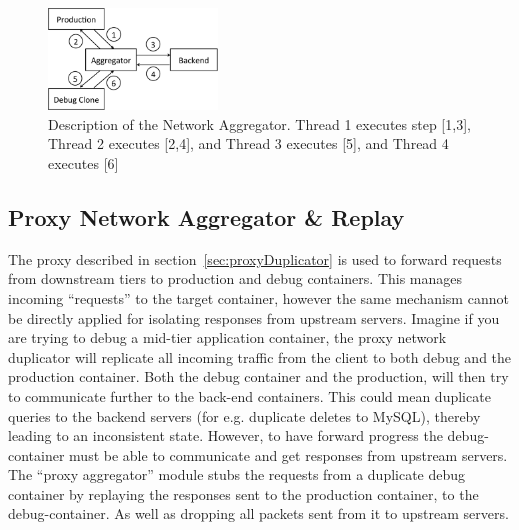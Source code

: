\begin{figure}[ht]
  \begin{center}
    \includegraphics[width=0.4\textwidth]{figs/aggregator.pdf}
    \caption{Description of the Network Aggregator. Thread 1 executes step [1,3], Thread 2 executes [2,4], and Thread 3 executes [5], and Thread 4 executes [6]}
    \label{fig:aggregator}
  \end{center}
\end{figure}

\subsection{Proxy Network Aggregator \& Replay }
\label{sec:proxyAggregator}
The proxy described in section~\ref{sec:proxyDuplicator} is used to forward requests from downstream tiers to production and debug containers.
This manages incoming ``requests'' to the target container, however the same mechanism cannot be directly applied for isolating responses from upstream servers.
Imagine if you are trying to debug a mid-tier application container, the proxy network duplicator will replicate all incoming traffic from the client to both debug and the production container. 
Both the debug container and the production, will then try to communicate further to the back-end containers.
This could mean duplicate queries to the backend servers (for e.g. duplicate deletes to MySQL), thereby leading to an inconsistent state.
However, to have forward progress the debug-container must be able to communicate and get responses from upstream servers.
The ``proxy aggregator'' module stubs the requests from a duplicate debug container by replaying the responses sent to the production container, to the debug-container.
As well as dropping all packets sent from it to upstream servers.

